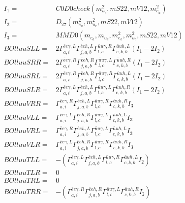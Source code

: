 \documentclass[A4,landscape]{article}
\begin{document}
\begin{align} 
I_1 = & C0D0check(m^2_{u_{{c}}}, mS22, mV12, m^2_{e_{{a}}}) \\ 
I_2 = & D_{27}(m^2_{e_{{a}}}, m^2_{u_{{c}}}, mS22, mV12) \\ 
I_3 = & MMD0(m_{e_{{a}}}, m_{u_{{c}}}, m^2_{e_{{a}}}, m^2_{u_{{c}}}, mS22, mV12) \\ 
  BOlluuSLL= & 2  \Gamma^{\bar{e}e \gamma ,L}_{a, i} \Gamma^{\bar{e}e h ,L}_{j, a, b} \Gamma^{\bar{u}u \gamma ,R}_{l, c} \Gamma^{\bar{u}u h ,L}_{c, k, b} (I_1 - 2 I_2) \\ 
  BOlluuSRR= & 2  \Gamma^{\bar{e}e \gamma ,R}_{a, i} \Gamma^{\bar{e}e h ,R}_{j, a, b} \Gamma^{\bar{u}u \gamma ,L}_{l, c} \Gamma^{\bar{u}u h ,R}_{c, k, b} (I_1 - 2 I_2) \\ 
  BOlluuSRL= & 2  \Gamma^{\bar{e}e \gamma ,R}_{a, i} \Gamma^{\bar{e}e h ,R}_{j, a, b} \Gamma^{\bar{u}u \gamma ,R}_{l, c} \Gamma^{\bar{u}u h ,L}_{c, k, b} (I_1 - 2 I_2) \\ 
  BOlluuSLR= & 2  \Gamma^{\bar{e}e \gamma ,L}_{a, i} \Gamma^{\bar{e}e h ,L}_{j, a, b} \Gamma^{\bar{u}u \gamma ,L}_{l, c} \Gamma^{\bar{u}u h ,R}_{c, k, b} (I_1 - 2 I_2) \\ 
  BOlluuVRR= &  \Gamma^{\bar{e}e \gamma ,R}_{a, i} \Gamma^{\bar{e}e h ,L}_{j, a, b} \Gamma^{\bar{u}u \gamma ,R}_{l, c} \Gamma^{\bar{u}u h ,R}_{c, k, b} I_3 \\ 
  BOlluuVLL= &  \Gamma^{\bar{e}e \gamma ,L}_{a, i} \Gamma^{\bar{e}e h ,R}_{j, a, b} \Gamma^{\bar{u}u \gamma ,L}_{l, c} \Gamma^{\bar{u}u h ,L}_{c, k, b} I_3 \\ 
  BOlluuVRL= &  \Gamma^{\bar{e}e \gamma ,R}_{a, i} \Gamma^{\bar{e}e h ,L}_{j, a, b} \Gamma^{\bar{u}u \gamma ,L}_{l, c} \Gamma^{\bar{u}u h ,L}_{c, k, b} I_3 \\ 
  BOlluuVLR= &  \Gamma^{\bar{e}e \gamma ,L}_{a, i} \Gamma^{\bar{e}e h ,R}_{j, a, b} \Gamma^{\bar{u}u \gamma ,R}_{l, c} \Gamma^{\bar{u}u h ,R}_{c, k, b} I_3 \\ 
  BOlluuTLL= & -( \Gamma^{\bar{e}e \gamma ,L}_{a, i} \Gamma^{\bar{e}e h ,L}_{j, a, b} \Gamma^{\bar{u}u \gamma ,R}_{l, c} \Gamma^{\bar{u}u h ,L}_{c, k, b} I_2) \\ 
  BOlluuTLR= & 0 \\ 
  BOlluuTRL= & 0 \\ 
  BOlluuTRR= & -( \Gamma^{\bar{e}e \gamma ,R}_{a, i} \Gamma^{\bar{e}e h ,R}_{j, a, b} \Gamma^{\bar{u}u \gamma ,L}_{l, c} \Gamma^{\bar{u}u h ,R}_{c, k, b} I_2) \\ 
\end{align} 
\end{document}

